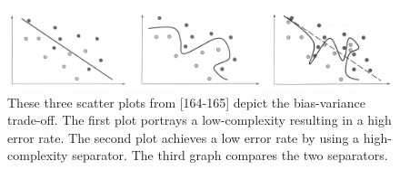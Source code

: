 \begin{figure}[h]
  \centering
  \includegraphics[width=1\textwidth]{./images/biasTradeOff.png}
  \caption{These three scatter plots from \textcite{DataMiningAndPredictiveAnalytics}[164-165] depict the bias-variance trade-off. The first plot portrays a low-complexity resulting in a high error rate. The second plot achieves a low error rate by using a high-complexity separator. The third graph compares the two separators.
  }
  \label{figure:biasTradeOff}
  
\end{figure}
















